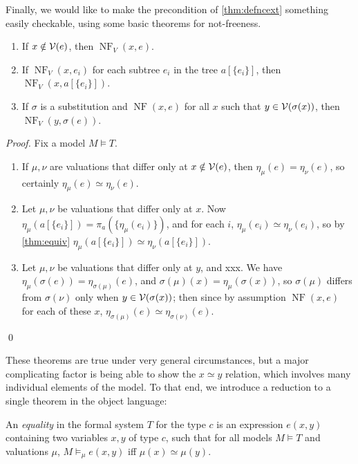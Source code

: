 \documentclass[runningheads,a4paper]{llncs}
\DeclareMathOperator{\NF}{NF}
\begin{document}
Finally, we would like to make the precondition of \autoref{thm:defncext} something easily checkable, using some basic theorems for not-freeness.

\begin{theorem}\label{thm:nf}
\begin{enumerate}
  \item If $x\notin{\cal V}(e)$, then $\NF_V(x,e)$.
  \item\label{thm:nf-comp} If $\NF_V(x,e_i)$ for each subtree $e_i$ in the tree $a[\{e_i\}]$, then $\NF_V(x,a[\{e_i\}])$.
  \item\label{thm:nf-subst} If $\sigma$ is a substitution and $\NF(x,e)$ for all $x$ such that $y\in{\cal V}(\sigma(x))$, then $\NF_V(y,\sigma(e))$.
\end{enumerate}
\end{theorem}
\begin{proof}
Fix a model $M\models T$.
\begin{enumerate}
  \item If $\mu,\nu$ are valuations that differ only at $x\notin{\cal V}(e)$, then $\eta_\mu(e)=\eta_\nu(e)$, so certainly $\eta_\mu(e)\simeq\eta_\nu(e)$.
  \item Let $\mu,\nu$ be valuations that differ only at $x$. Now $\eta_\mu(a[\{e_i\}])=\pi_a(\{\eta_\mu(e_i)\})$, and for each $i$, $\eta_\mu(e_i)\simeq\eta_\nu(e_i)$, so by \autoref{thm:equiv} $\eta_\mu(a[\{e_i\}])\simeq\eta_\nu(a[\{e_i\}])$.
  \item Let $\mu,\nu$ be valuations that differ only at $y$, and xxx. We have $\eta_\mu(\sigma(e))=\eta_{\sigma(\mu)}(e)$, and $\sigma(\mu)(x)=\eta_\mu(\sigma(x))$, so $\sigma(\mu)$ differs from $\sigma(\nu)$ only when $y\in{\cal V}(\sigma(x))$; then since by assumption $\NF(x,e)$ for each of these $x$, $\eta_{\sigma(\mu)}(e)\simeq\eta_{\sigma(\nu)}(e)$.
\end{enumerate}
\qed\end{proof}

These theorems are true under very general circumstances, but a major complicating factor is being able to show the $x\simeq y$ relation, which involves many individual elements of the model. To that end, we introduce a reduction to a single theorem in the object language:

\begin{definition}
An {\em equality} in the formal system $T$ for the type $c$ is an expression $e(x,y)$ containing two variables $x,y$ of type $c$, such that for all models $M\models T$ and valuations $\mu$, $M\models_\mu e(x,y)$ iff $\mu(x)\simeq\mu(y)$.
\end{definition}
\end{document}
